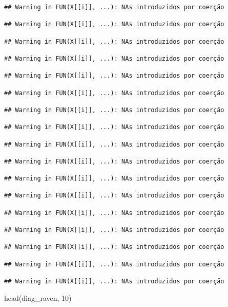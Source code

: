 \documentclass[
]{article}
\newenvironment{Shaded}{\begin{snugshade}}{\end{snugshade}}
\newcommand{\DecValTok}[1]{\textcolor[rgb]{0.00,0.00,0.81}{#1}}
\newcommand{\FunctionTok}[1]{\textcolor[rgb]{0.00,0.00,0.00}{#1}}
\newcommand{\NormalTok}[1]{#1}
\begin{document}
\begin{verbatim}
## Warning in FUN(X[[i]], ...): NAs introduzidos por coerção

## Warning in FUN(X[[i]], ...): NAs introduzidos por coerção

## Warning in FUN(X[[i]], ...): NAs introduzidos por coerção

## Warning in FUN(X[[i]], ...): NAs introduzidos por coerção

## Warning in FUN(X[[i]], ...): NAs introduzidos por coerção

## Warning in FUN(X[[i]], ...): NAs introduzidos por coerção

## Warning in FUN(X[[i]], ...): NAs introduzidos por coerção

## Warning in FUN(X[[i]], ...): NAs introduzidos por coerção

## Warning in FUN(X[[i]], ...): NAs introduzidos por coerção

## Warning in FUN(X[[i]], ...): NAs introduzidos por coerção

## Warning in FUN(X[[i]], ...): NAs introduzidos por coerção

## Warning in FUN(X[[i]], ...): NAs introduzidos por coerção

## Warning in FUN(X[[i]], ...): NAs introduzidos por coerção

## Warning in FUN(X[[i]], ...): NAs introduzidos por coerção

## Warning in FUN(X[[i]], ...): NAs introduzidos por coerção

## Warning in FUN(X[[i]], ...): NAs introduzidos por coerção

## Warning in FUN(X[[i]], ...): NAs introduzidos por coerção
\end{verbatim}

\begin{Shaded}
\begin{Highlighting}[]
\FunctionTok{head}\NormalTok{(diag\_raven, }\DecValTok{10}\NormalTok{)}
\end{Highlighting}
\end{Shaded}
\end{document}
